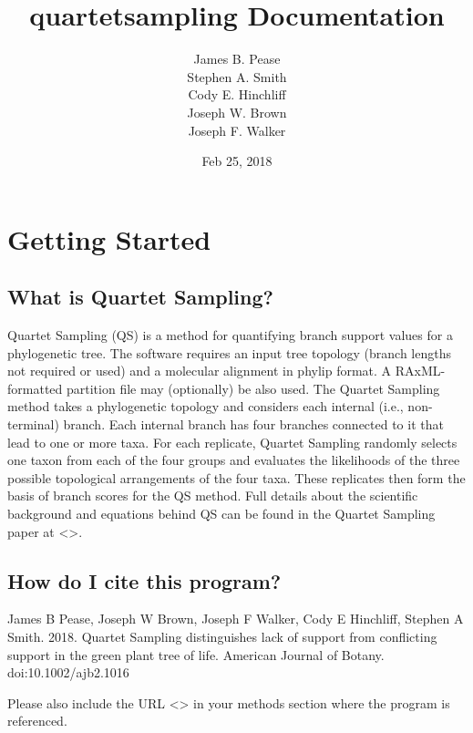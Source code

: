 \documentclass[letterpaper,12pt,english]{sphinxmanual}
\title{quartetsampling Documentation}
\date{Feb 25, 2018}
\author{James B. Pease \\ Stephen A. Smith \\ Cody E. Hinchliff \\Joseph W. Brown \\ Joseph F. Walker}
\begin{document}
\maketitle
\sphinxtableofcontents
{}\label{\detokenize{index::doc}}



\chapter{Getting Started}
\label{\detokenize{intro:intro}}\label{\detokenize{intro::doc}}\label{\detokenize{intro:manual-for-quartetsampling}}\label{\detokenize{intro:getting-started}}

\section{What is Quartet Sampling?}
\label{\detokenize{intro:what-is-quartet-sampling}}
Quartet Sampling (QS) is a method for quantifying branch support values for a phylogenetic tree.  The software requires an input tree topology (branch lengths not required or used) and a molecular alignment in phylip format.  A RAxML-formatted partition file may (optionally) be also used.  The Quartet Sampling method takes a phylogenetic topology and considers each internal (i.e., non-terminal) branch.  Each internal branch has four branches connected to it that lead to one or more taxa.  For each replicate, Quartet Sampling randomly selects one taxon from each of the four groups and evaluates the likelihoods of the three possible topological arrangements of the four taxa.  These replicates then form the basis of branch scores for the QS method.  Full details about the scientific background and equations behind QS can be found in the Quartet Sampling paper at \textless{}\textgreater{}.


\section{How do I cite this program?}
\label{\detokenize{intro:how-do-i-cite-this-program}}
James B Pease, Joseph W Brown, Joseph F Walker, Cody E Hinchliff, Stephen A Smith. 2018. Quartet Sampling distinguishes lack of support from conflicting support in the green plant tree of life. American Journal of Botany. doi:10.1002/ajb2.1016

Please also include the URL \textless{}\textgreater{} in your methods section where the program is referenced.
\end{document}
